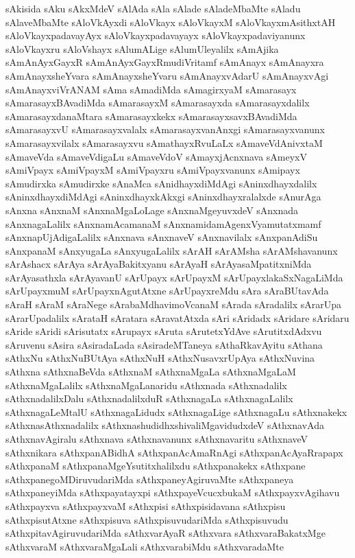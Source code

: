 {sAkisida
sAku
sAkxMdeV
sAlAda
sAla
sAlade
sAladeMbaMte
sAladu
sAlaveMbaMte
sAloVkAyxdi
sAloVkayx
sAloVkayxM
sAloVkayxmAsithxtAH
sAloVkayxpadavayAyx
sAloVkayxpadavayayx
sAloVkayxpadaviyanunx
sAloVkayxru
sAloVshayx
sAlumALige
sAlumUleyalilx
sAmAjika
sAmAnAyxGayxR
sAmAnAyxGayxRmudiVritamf
sAmAnayx
sAmAnayxra
sAmAnayxsheYvara
sAmAnayxsheYvaru
sAmAnayxvAdarU
sAmAnayxvAgi
sAmAnayxviVrANAM
sAma
sAmadiMda
sAmagirxyaM
sAmarasayx
sAmarasayxBAvadiMda
sAmarasayxM
sAmarasayxda
sAmarasayxdalilx
sAmarasayxdanaMtara
sAmarasayxkekx
sAmarasayxsavxBAvadiMda
sAmarasayxvU
sAmarasayxvalalx
sAmarasayxvanAnxgi
sAmarasayxvanunx
sAmarasayxvilalx
sAmarasayxvu
sAmathayxRvuLaLx
sAmaveVdAnivxtaM
sAmaveVda
sAmaveVdigaLu
sAmaveVdoV
sAmayxjAcnxnava
sAmeyxV
sAmiVpayx
sAmiVpayxM
sAmiVpayxru
sAmiVpayxvanunx
sAmipayx
sAmudirxka
sAmudirxke
sAnaMca
sAnidhayxdiMdAgi
sAninxdhayxdalilx
sAninxdhayxdiMdAgi
sAninxdhayxkAkxgi
sAninxdhayxralalxde
sAnurAga
sAnxna
sAnxnaM
sAnxnaMgaLoLage
sAnxnaMgeyuvxdeV
sAnxnada
sAnxnagaLalilx
sAnxnamAcamanaM
sAnxnamidamAgenxVyamutatxmamf
sAnxnapUjAdigaLalilx
sAnxnava
sAnxnaveV
sAnxnavilalx
sAnxpanAdiSu
sAnxpanaM
sAnxyugaLa
sAnxyugaLalilx
sArAH
sArAMsha
sArAMshavanunx
sArAshacx
sArAya
sArAyaBakitxyanu
sArAyaH
sArAyasaMpatitxniMda
sArAyasathxla
sArAyavanU
sArUpayx
sArUpayxM
sArUpayxlakaSxNagaLiMda
sArUpayxmuM
sArUpayxnAgutAtxne
sArUpayxreMdu
sAra
sAraBUtavAda
sAraH
sAraM
sAraNege
sArabaMdhavimoVcanaM
sArada
sAradalilx
sArarUpa
sArarUpadalilx
sArataH
sAratara
sAravatAtxda
sAri
sAridadx
sAridare
sAridaru
sAride
sAridi
sArisutatx
sArupayx
sAruta
sArutetxYdAve
sArutitxdAdxvu
sAruvenu
sAsira
sAsiradaLada
sAsiradeMTaneya
sAthaRkavAyitu
sAthana
sAthxNu
sAthxNuBUtAya
sAthxNuH
sAthxNusavxrUpAya
sAthxNuvina
sAthxna
sAthxnaBeVda
sAthxnaM
sAthxnaMgaLa
sAthxnaMgaLaM
sAthxnaMgaLalilx
sAthxnaMgaLanaridu
sAthxnada
sAthxnadalilx
sAthxnadalilxDalu
sAthxnadalilxduR
sAthxnagaLa
sAthxnagaLalilx
sAthxnagaLeMtalU
sAthxnagaLidudx
sAthxnagaLige
sAthxnagaLu
sAthxnakekx
sAthxnasAthxnadalilx
sAthxnashudidhxshivaliMgavidudxdeV
sAthxnavAda
sAthxnavAgiralu
sAthxnava
sAthxnavanunx
sAthxnavaritu
sAthxnaveV
sAthxnikara
sAthxpanABidhA
sAthxpanAcAmaRnAgi
sAthxpanAcAyaRrapapx
sAthxpanaM
sAthxpanaMgeYsutitxhalilxdu
sAthxpanakekx
sAthxpane
sAthxpanegoMDiruvudariMda
sAthxpaneyAgiruvaMte
sAthxpaneya
sAthxpaneyiMda
sAthxpayatayxpi
sAthxpayeVcucxbukaM
sAthxpayxvAgihavu
sAthxpayxva
sAthxpayxvaM
sAthxpisi
sAthxpisidavana
sAthxpisu
sAthxpisutAtxne
sAthxpisuva
sAthxpisuvudariMda
sAthxpisuvudu
sAthxpitavAgiruvudariMda
sAthxvarAyaR
sAthxvara
sAthxvaraBakatxMge
sAthxvaraM
sAthxvaraMgaLali
sAthxvarabiMdu
sAthxvaradaMte
}
